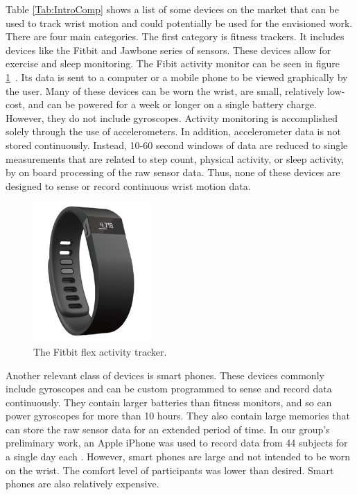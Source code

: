 Table \ref{Tab:IntroComp} shows a list of some devices on the market that can be used to track wrist motion and could potentially be used for the envisioned work.
There are four main categories.  The first category is fitness trackers.  It includes devices like the
Fitbit \cite{Web:FitBitOfficial} and Jawbone \cite{Web:JawBoneWebsite} series of sensors.
These devices allow for exercise and sleep monitoring. The Fibit activity monitor can be seen in figure \ref{fig:FitbitJawbone}~\cite{Web:FitbitImage}.  Its data is sent to a computer or a mobile phone to be viewed graphically by the user.
Many of these devices can be worn the wrist, are small, relatively low-cost, and can be powered for a week or longer on a single battery charge.
However, they do not include gyroscopes.  Activity monitoring is accomplished solely through the use of accelerometers.  In addition, accelerometer data is not stored continuously.  Instead, 10-60 second windows of data are reduced to single measurements that are related to step count, physical activity, or sleep activity, by on board processing of the raw sensor data.    Thus, none of these devices are designed to sense or record continuous wrist motion data.

\begin{figure}
\begin{center}
\includegraphics[width=0.4\textwidth]{images/JawFit.png}
\caption{The Fitbit flex activity tracker.}
\label{fig:FitbitJawbone}
\end{center}
\end{figure}

Another relevant class of devices is smart phones.  These devices commonly include gyroscopes and can be custom programmed to sense and record data continuously.  They contain larger batteries than fitness monitors, and so can power gyroscopes for more than 10 hours.  They also contain large memories that can store the raw sensor data for an extended period of time.  In our group's preliminary work, an Apple iPhone was used to record data from 44 subjects for a single day each \cite{Dong2014}.  However, smart phones are large and not intended to be worn on the wrist.  The comfort level of participants was lower than desired.  Smart phones are also relatively expensive.

